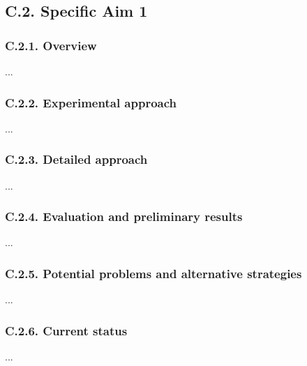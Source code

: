\subsection{C.2. Specific Aim 1}

\vspace{1cm}
\subsubsection{C.2.1. Overview}

...

\subsubsection{C.2.2. Experimental approach}

...

\subsubsection{C.2.3. Detailed approach}

...

\subsubsection{C.2.4. Evaluation and preliminary results}

...

\subsubsection{C.2.5. Potential problems and alternative strategies}

...

\subsubsection{C.2.6. Current status}

...
